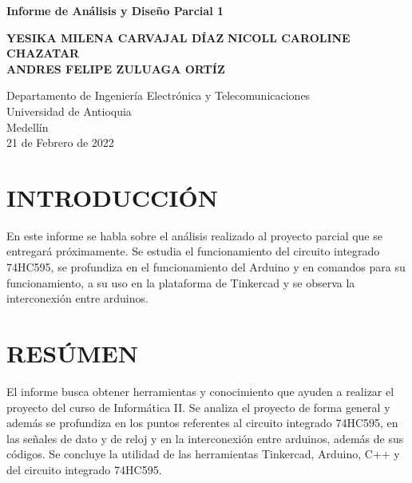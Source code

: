 \documentclass{article}
\begin{document}
\begin{titlepage}
    \begin{center}
        \vspace*{1cm}
            
        \Huge
        \textbf{Informe de Análisis y Diseño Parcial 1}
            
        \vspace{0.5cm}
        \LARGE
            
        \vspace{1.5cm}
            
        \textbf{YESIKA MILENA CARVAJAL DÍAZ}
        \textbf{NICOLL CAROLINE CHAZATAR}\\
        \textbf{ANDRES FELIPE ZULUAGA ORTÍZ}
            
        \vfill
            
        \vspace{0.8cm}
            
        \Large
        Departamento de Ingeniería Electrónica y Telecomunicaciones\\
        Universidad de Antioquia\\
        Medellín\\
        21 de Febrero de 2022
            
    \end{center}
\end{titlepage}

\tableofcontents
\newpage

\section{INTRODUCCIÓN}
En este informe se habla sobre el análisis realizado al proyecto parcial que se entregará próximamente. Se estudia el funcionamiento del circuito integrado 74HC595, se profundiza en el funcionamiento del Arduino y en comandos para su funcionamiento, a su uso en la plataforma de Tinkercad y se observa la interconexión entre arduinos.

\section{RESÚMEN}
El informe busca obtener herramientas y conocimiento que ayuden a realizar el proyecto del curso de Informática II. Se analiza el proyecto de forma general y además se profundiza en los puntos referentes al circuito integrado 74HC595, en las señales de dato y de reloj y en la interconexión entre arduinos, además de sus códigos. Se concluye la utilidad de las herramientas Tinkercad, Arduino, C++ y del circuito integrado 74HC595.
\end{document}
